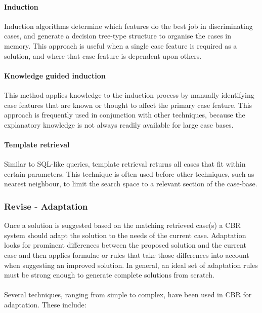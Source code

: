 \paragraph{Induction}
\label{Induction}Induction algorithms determine which features do the best job 
in discriminating cases, and generate a decision tree-type structure to organise 
the cases in memory. This approach is useful when a single case feature is 
required as a solution, and where that case feature is dependent upon others.

\paragraph{Knowledge guided induction}
\label{Knowledge guided induction} This method applies knowledge to the induction 
process by manually identifying case features that are known or thought to affect 
the primary case feature. This approach is frequently used in conjunction with other 
techniques, because the explanatory knowledge is not always readily available for large case bases.

\paragraph{Template retrieval}
\label{template} Similar to SQL-like queries, template retrieval returns all 
cases that fit within certain parameters. This technique is often used before 
other techniques, such as nearest neighbour, to limit the search space to a 
relevant section of the case-base.

\subsubsection{Revise - Adaptation}
\label{Revise} Once a solution is suggested based on the matching retrieved case(s) 
a CBR system should adapt the solution to the needs of the current case. Adaptation 
looks for prominent differences between the proposed solution and the current case and 
then applies formulae or rules that take those differences into account when 
suggesting an improved solution. In general, an ideal set of adaptation rules must be strong enough to generate complete solutions from scratch.

\paragraph{}
Several techniques, ranging from simple to complex, have been used in CBR for adaptation. These include:

